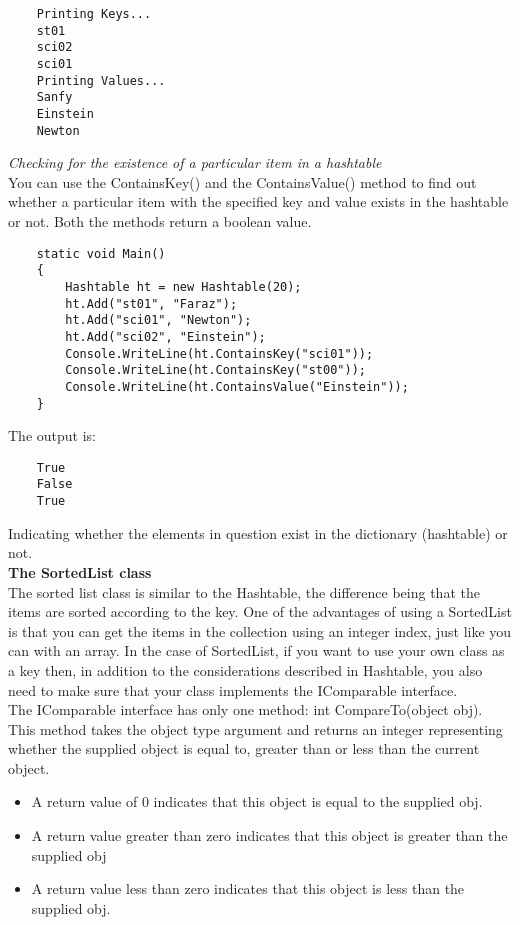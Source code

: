 \begin{lstlisting}
    Printing Keys...
    st01
    sci02
    sci01
    Printing Values...
    Sanfy
    Einstein
    Newton
\end{lstlisting}

\emph{Checking for the existence of a particular item in a hashtable}\\

You can use the ContainsKey() and the ContainsValue() method to find out whether a particular item with the
specified key and value exists in the hashtable or not. Both the methods return a boolean value.

\begin{lstlisting}
    static void Main()
    {
        Hashtable ht = new Hashtable(20);
        ht.Add("st01", "Faraz");
        ht.Add("sci01", "Newton");
        ht.Add("sci02", "Einstein");
        Console.WriteLine(ht.ContainsKey("sci01"));
        Console.WriteLine(ht.ContainsKey("st00"));
        Console.WriteLine(ht.ContainsValue("Einstein"));
    }    
\end{lstlisting}

The output is:

\begin{lstlisting}
    True
    False
    True    
\end{lstlisting}

Indicating whether the elements in question exist in the dictionary (hashtable) or not.\\

\textbf{The SortedList class}\\

The sorted list class is similar to the Hashtable, the difference being that the items are sorted according to the key.
One of the advantages of using a SortedList is that you can get the items in the collection using an integer index,
just like you can with an array. In the case of SortedList, if you want to use your own class as a key then, in addition
to the considerations described in Hashtable, you also need to make sure that your class implements the
IComparable interface.\\

The IComparable interface has only one method: int CompareTo(object obj). This method takes the object type
argument and returns an integer representing whether the supplied object is equal to, greater than or less than the
current object.

\begin{itemize}
    \item A return value of 0 indicates that this object is equal to the supplied obj.
    \item A return value greater than zero indicates that this object is greater than the supplied obj
    \item A return value less than zero indicates that this object is less than the supplied obj.
\end{itemize}

